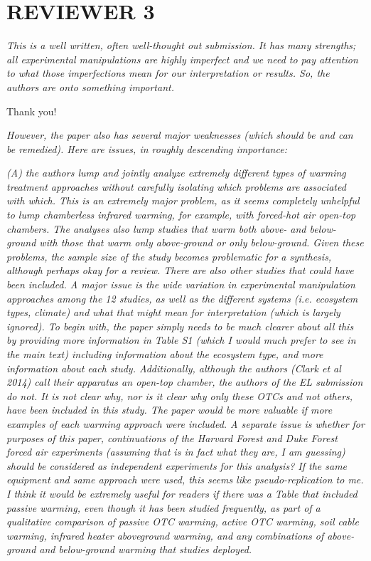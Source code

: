 \documentclass[11pt,a4paper]{letter}
\begin{document}
\begin{letter}{}
\section {REVIEWER 3}

\emph{This is a well written, often well-thought out submission. It has many strengths; all experimental manipulations are highly imperfect and we need to pay attention to what those imperfections mean for our interpretation or results. So, the authors are onto something important.}

\par Thank you!

\par \emph{However, the paper also has several major weaknesses (which should be and can be remedied). Here are issues, in roughly descending importance:}

\par \emph{(A) the authors lump and jointly analyze extremely different types of warming treatment approaches without carefully isolating which problems are associated with which. This is an extremely major problem, as it seems completely unhelpful to lump chamberless infrared warming, for example, with forced-hot air open-top chambers. The analyses also lump studies that warm both above- and below-ground with those that warm only above-ground or only below-ground. Given these problems, the sample size of the study becomes problematic for a synthesis, although perhaps okay for a review. There are also other studies that could have been included. A major issue is the wide variation in experimental manipulation approaches among the 12 studies, as well as the different systems (i.e. ecosystem types, climate) and what that might mean for interpretation (which is largely ignored). To begin with, the paper simply needs to be much clearer about all this by providing more information in Table S1 (which I would much prefer to see in the main text) including information about the ecosystem type, and more information about each study. Additionally, although the authors (Clark et al 2014) call their apparatus an open-top chamber, the authors of the EL submission do not. It is not clear why, nor is it clear why only these OTCs and not others, have been included in this study. The paper would be more valuable if more examples of each warming approach were included. A separate issue is whether for purposes of this paper, continuations of the Harvard Forest and Duke Forest forced air experiments (assuming that is in fact what they are, I am guessing) should be considered as independent experiments for this analysis? If the same equipment and same approach were used, this seems like pseudo-replication to me. I think it would be extremely useful for readers if there was a Table that included passive warming, even though it has been studied frequently, as part of a qualitative comparison of passive OTC warming, active OTC warming, soil cable warming, infrared heater aboveground warming, and any combinations of above-ground and below-ground warming that studies deployed.}


\end{letter}
\end{document}

